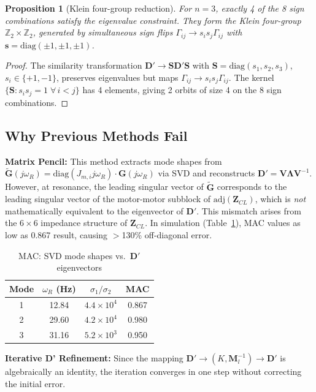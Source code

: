 \documentclass[10pt,twocolumn]{article}
\newtheorem{proposition}{Proposition}
\newcommand{\diag}{\mathrm{diag}}
\begin{document}
\begin{proposition}[Klein four-group reduction]
For $n{=}3$, exactly 4 of the 8 sign combinations satisfy the eigenvalue constraint. They form the Klein four-group $\mathbb{Z}_2 \times \mathbb{Z}_2$, generated by simultaneous sign flips $\Gamma_{ij} \to s_i s_j \Gamma_{ij}$ with $\bm{s} = \diag(\pm1,\pm1,\pm1)$.
\label{prop:klein}
\end{proposition}
\begin{proof}
The similarity transformation $\bm{D}' \to \bm{S}\bm{D}'\bm{S}$ with $\bm{S} = \diag(s_1,s_2,s_3)$, $s_i \in \{+1,-1\}$, preserves eigenvalues but maps $\Gamma_{ij} \to s_i s_j \Gamma_{ij}$. The kernel $\{\bm{S}: s_i s_j = 1\;\forall\,i<j\}$ has 4 elements, giving 2 orbits of size 4 on the 8 sign combinations.
\end{proof}

\subsection{Why Previous Methods Fail}

\textbf{Matrix Pencil:} This method extracts mode shapes from $\tilde{\bm{G}}(j\omega_R) = \diag(J_{m,i} j\omega_R) \cdot \bm{G}(j\omega_R)$ via SVD and reconstructs $\bm{D}' = \bm{V}\bm{\Lambda}\bm{V}^{-1}$. However, at resonance, the leading singular vector of $\tilde{\bm{G}}$ corresponds to the leading singular vector of the motor-motor subblock of $\mathrm{adj}(\bm{Z}_{CL})$, which is \emph{not} mathematically equivalent to the eigenvector of $\bm{D}'$. This mismatch arises from the $6\times 6$ impedance structure of $\bm{Z}_{CL}$.  In simulation (Table~\ref{tab:mac}), MAC values as low as 0.867 result, causing $>$130\% off-diagonal error.

\begin{table}[ht]
\centering
\caption{MAC: SVD mode shapes vs.\ $\bm{D}'$ eigenvectors}
\label{tab:mac}
\begin{tabular}{cccc}
\toprule
Mode & $\omega_R$ (Hz) & $\sigma_1/\sigma_2$ & MAC \\
\midrule
1 & 12.84 & $4.4\times 10^4$ & 0.867 \\
2 & 29.60 & $4.2\times 10^4$ & 0.980 \\
3 & 31.16 & $5.2\times 10^3$ & 0.950 \\
\bottomrule
\end{tabular}
\end{table}

\textbf{Iterative D' Refinement:} Since the mapping $\bm{D}' \to (K,\bm{M}_l^{-1}) \to \bm{D}'$ is algebraically an identity, the iteration converges in one step without correcting the initial error.
\end{document}
